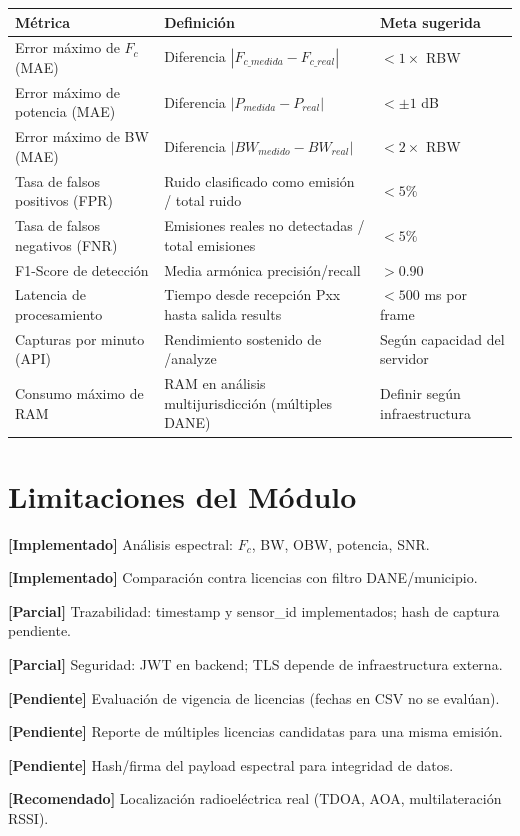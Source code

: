 \begin{tabular}{p{5cm}p{5cm}p{4cm}}
\textbf{Métrica} & \textbf{Definición} & \textbf{Meta sugerida} \\
\hline
Error máximo de $F_c$ (MAE) & Diferencia $|F_{c\_medida} - F_{c\_real}|$ & $< 1 \times$ RBW \\
Error máximo de potencia (MAE) & Diferencia $|P_{medida} - P_{real}|$ & $< \pm 1$ dB \\
Error máximo de BW (MAE) & Diferencia $|BW_{medido} - BW_{real}|$ & $< 2 \times$ RBW \\
Tasa de falsos positivos (FPR) & Ruido clasificado como emisión / total ruido & $< 5\%$ \\
Tasa de falsos negativos (FNR) & Emisiones reales no detectadas / total emisiones & $< 5\%$ \\
F1-Score de detección & Media armónica precisión/recall & $> 0.90$ \\
Latencia de procesamiento & Tiempo desde recepción Pxx hasta salida results & $< 500$ ms por frame \\
Capturas por minuto (API) & Rendimiento sostenido de /analyze & Según capacidad del servidor \\
Consumo máximo de RAM & RAM en análisis multijurisdicción (múltiples DANE) & Definir según infraestructura \\
\end{tabular}

\section{Limitaciones del Módulo}

\textbf{[Implementado]} Análisis espectral: $F_c$, BW, OBW, potencia, SNR.

\textbf{[Implementado]} Comparación contra licencias con filtro DANE/municipio.

\textbf{[Parcial]} Trazabilidad: timestamp y sensor\_id implementados; hash de captura pendiente.

\textbf{[Parcial]} Seguridad: JWT en backend; TLS depende de infraestructura externa.

\textbf{[Pendiente]} Evaluación de vigencia de licencias (fechas en CSV no se evalúan).

\textbf{[Pendiente]} Reporte de múltiples licencias candidatas para una misma emisión.

\textbf{[Pendiente]} Hash/firma del payload espectral para integridad de datos.

\textbf{[Recomendado]} Localización radioeléctrica real (TDOA, AOA, multilateración RSSI).

